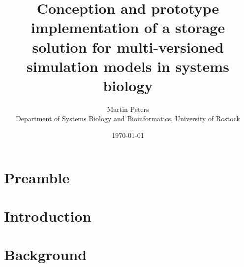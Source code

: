 \documentclass[12pt, a4paper, titlepage]{book}
\title{Conception and prototype implementation of a storage solution for multi-versioned simulation models in systems biology}
\author{Martin Peters\\ \small Department of Systems Biology and Bioinformatics, University of Rostock}
\date{\today}
\begin{document}
	\maketitle
	\printindex
	
	
	
	\chapter{Preamble}
	\chapter{Introduction}
	
	\chapter{Background}
\end{document}
